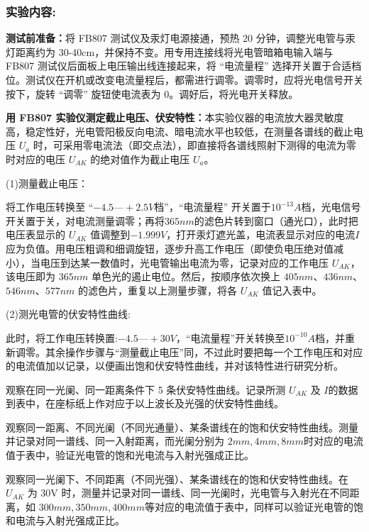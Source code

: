 \documentclass[10pt,a4paper]{ctexart}
\begin{document}
    \subsubsection*{实验内容:}

    \textbf{测试前准备：}将 FB807 测试仪及汞灯电源接通，预热 20 分钟，调整光电管与汞灯距离约为 30-40cm，并保持不变。用专用连接线将光电管暗箱电输入端与 FB807 测试仪后面板上电压输出线连接起来，将 “电流量程” 选择开关置于合适档位。测试仪在开机或改变电流量程后，都需进行调零。调零时，应将光电信号开关按下，旋转 “调零” 旋钮使电流表为 0。调好后，将光电开关释放。
    
    \textbf{用 FB807 实验仪测定截止电压、伏安特性：}本实验仪器的电流放大器灵敏度高，稳定性好，光电管阳极反向电流、暗电流水平也较低，在测量各谱线的截止电压 $U_a$ 时，可采用零电流法（即交点法），即直接将各谱线照射下测得的电流为零时对应的电压 $U_{AK}$ 的绝对值作为截止电压 $U_a$。
    
    (1)测量截止电压：
    
    将工作电压转换至 “$-4.5—+ 2.5V $档”，“电流量程” 开关置于\(10^{-13}A\)档，光电信号开关置于关，对电流测量调零；再将$ 365nm $的滤色片转到窗口（通光口），此时把电压表显示的 $U_{AK}$ 值调整到$ - 1.999V$，打开汞灯遮光盖，电流表显示对应的电流$I$应为负值。用电压粗调和细调旋钮，逐步升高工作电压（即使负电压绝对值减小），当电压到达某一数值时，光电管输出电流为零，记录对应的工作电压 $U_{AK}$，该电压即为 $365nm$ 单色光的遏止电位。然后，按顺序依次换上 $405nm$、$436nm$、$546nm$、$577nm$ 的滤色片，重复以上测量步骤，将各 $U_{AK}$ 值记入表中。

    (2)测光电管的伏安特性曲线:

    此时，将工作电压转换置:$-4.5—+30V$，“电流量程”开关转换至\(10^{-10}A\)档，并重新调零。其余操作步骤与“测量截止电压”同，不过此时要把每一个工作电压和对应的电流值加以记录，以便画出饱和伏安特性曲线，并对该特性进行研究分析。

    观察在同一光阑、同一距离条件下 5 条伏安特性曲线。记录所测  $U_{AK}$ 及 $I$的数据到表中，在座标纸上作对应于以上波长及光强的伏安特性曲线。
    
    观察同一距离、不同光阑（不同光通量）、某条谱线在的饱和伏安特性曲线。测量并记录对同一谱线、同一入射距离，而光阑分别为 $2mm,4mm,8mm$时对应的电流值于表中，验证光电管的饱和光电流与入射光强成正比。

    观察同一光阑下、不同距离（不同光强）、某条谱线在的饱和伏安特性曲线。在 $U_{AK}$ 为 30V 时，测量并记录对同一谱线、同一光阑时，光电管与入射光在不同距
离，如 $300mm,350mm,400mm$等对应的电流值于表中，同样可以验证光电管的饱
和电流与入射光强成正比。
\end{document}
